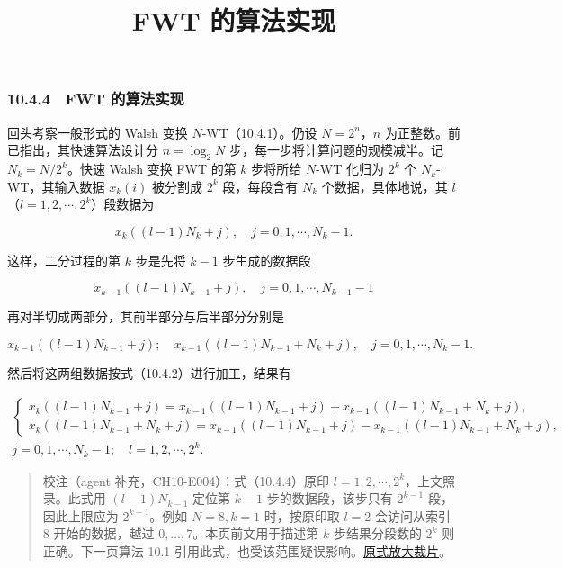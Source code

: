 \documentclass[
  10pt,
  fontset=fandol]{ctexart}
\title{FWT 的算法实现}
\author{}
\date{}
\begin{document}
\maketitle

\subsubsection{10.4.4　FWT 的算法实现}\label{fwt-ux7684ux7b97ux6cd5ux5b9eux73b0}

回头考察一般形式的 Walsh 变换 \(N\)-WT（10.4.1）。仍设 \(N=2^n\)，\(n\) 为正整数。前已指出，其快速算法设计分 \(n=\log_2N\) 步，每一步将计算问题的规模减半。记 \(N_k=N/2^k\)。快速 Walsh 变换 FWT 的第 \(k\) 步将所给 \(N\)-WT 化归为 \(2^k\) 个 \(N_k\)-WT，其输入数据 \(x_k(i)\) 被分割成 \(2^k\) 段，每段含有 \(N_k\) 个数据，具体地说，其 \(l\)（\(l=1,2,\cdots,2^k\)）段数据为

\[
x_k((l-1)N_k+j),\quad j=0,1,\cdots,N_k-1.
\]

这样，二分过程的第 \(k\) 步是先将 \(k-1\) 步生成的数据段

\[
x_{k-1}((l-1)N_{k-1}+j),\quad j=0,1,\cdots,N_{k-1}-1
\]

再对半切成两部分，其前半部分与后半部分分别是

\[
x_{k-1}((l-1)N_{k-1}+j);\quad x_{k-1}((l-1)N_{k-1}+N_k+j),\quad j=0,1,\cdots,N_k-1.
\]

然后将这两组数据按式（10.4.2）进行加工，结果有

\[
\begin{gathered}
\begin{cases}
x_k((l-1)N_{k-1}+j)=x_{k-1}((l-1)N_{k-1}+j)+x_{k-1}((l-1)N_{k-1}+N_k+j),\\
x_k((l-1)N_{k-1}+N_k+j)=x_{k-1}((l-1)N_{k-1}+j)-x_{k-1}((l-1)N_{k-1}+N_k+j),
\end{cases}\\
j=0,1,\cdots,N_k-1;\quad l=1,2,\cdots,2^k.
\end{gathered}
\tag{10.4.4}
\]

\begin{quote}
校注（agent 补充，CH10-E004）：式（10.4.4）原印 \(l=1,2,\cdots,2^k\)，上文照录。此式用 \((l-1)N_{k-1}\) 定位第 \(k-1\) 步的数据段，该步只有 \(2^{k-1}\) 段，因此上限应为 \(2^{k-1}\)。例如 \(N=8,k=1\) 时，按原印取 \(l=2\) 会访问从索引 8 开始的数据，越过 \(0,\ldots,7\)。本页前文用于描述第 \(k\) 步结果分段数的 \(2^k\) 则正确。下一页算法 10.1 引用此式，也受该范围疑误影响。\href{../assets/ch10/erratum-p274-range.png}{原式放大裁片}。
\end{quote}
\end{document}
